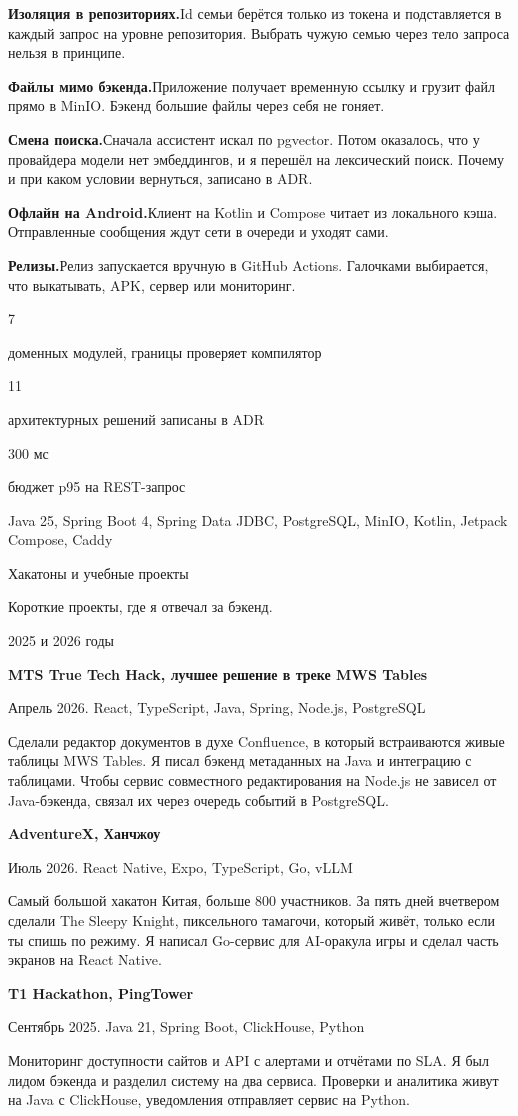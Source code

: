 \documentclass[10pt,a4paper]{article}
\newcommand{\casehead}[3]{%
  {\display\fontsize{30}{32}\selectfont #1\par}
  \vspace{2pt}
  {\large #2\par}
  \vspace{2pt}
  {\small\color{muted} #3\par}
  \vspace{8pt}
}
\newcommand{\blocklabel}[1]{\vspace{6pt}{\medium\small\color{accent} #1}\par\vspace{-2pt}}
\newcommand{\decision}[2]{\textbf{#1}\quad #2\par}
\newcommand{\result}[2]{%
  \begin{minipage}[t]{0.31\textwidth}
    {\display\fontsize{22}{24}\selectfont\color{accent} #1\par}
    \vspace{2pt}
    {\small\RaggedRight\color{muted} #2\par}
  \end{minipage}%
}
\newcommand{\results}[6]{%
  \vspace{8pt}
  \noindent\result{#1}{#2}\hfill\result{#3}{#4}\hfill\result{#5}{#6}\par
  \vspace{4pt}
}
\newcommand{\project}[3]{%
  \begin{minipage}[t]{\linewidth}
    {\large\textbf{#1}\par}
    {\small\color{muted} #2\par}
    \vspace{2pt}
    #3\par
  \end{minipage}\par\vspace{10pt}
}
\begin{document}
\blocklabel{Решения}
\decision{Изоляция в репозиториях.}{Id семьи берётся только из токена и подставляется в каждый запрос на
уровне репозитория. Выбрать чужую семью через тело запроса нельзя в принципе.}

\decision{Файлы мимо бэкенда.}{Приложение получает временную ссылку и грузит файл прямо в MinIO.
Бэкенд большие файлы через себя не гоняет.}

\decision{Смена поиска.}{Сначала ассистент искал по pgvector. Потом оказалось, что у провайдера модели нет
эмбеддингов, и я перешёл на лексический поиск. Почему и при каком условии вернуться, записано в ADR.}

\decision{Офлайн на Android.}{Клиент на Kotlin и Compose читает из локального кэша. Отправленные сообщения
ждут сети в очереди и уходят сами.}

\decision{Релизы.}{Релиз запускается вручную в GitHub Actions. Галочками выбирается, что выкатывать, APK,
сервер или мониторинг.}

\results
  {7}{доменных модулей, границы проверяет компилятор}
  {11}{архитектурных решений записаны в ADR}
  {300 мс}{бюджет p95 на REST-запрос}

{\small\color{muted} Java 25, Spring Boot 4, Spring Data JDBC, PostgreSQL, MinIO, Kotlin, Jetpack Compose, Caddy\par}

\newpage
\casehead{Хакатоны и учебные проекты}
  {Короткие проекты, где я отвечал за бэкенд.}
  {2025 и 2026 годы}

\project{MTS True Tech Hack, лучшее решение в треке MWS Tables}{Апрель 2026. React, TypeScript, Java, Spring, Node.js, PostgreSQL}
{Сделали редактор документов в духе Confluence, в который встраиваются живые таблицы MWS Tables. Я писал
бэкенд метаданных на Java и интеграцию с таблицами. Чтобы сервис совместного редактирования на Node.js не
зависел от Java-бэкенда, связал их через очередь событий в PostgreSQL.}

\project{AdventureX, Ханчжоу}{Июль 2026. React Native, Expo, TypeScript, Go, vLLM}
{Самый большой хакатон Китая, больше 800 участников. За пять дней вчетвером сделали The Sleepy Knight,
пиксельного тамагочи, который живёт, только если ты спишь по режиму. Я написал Go-сервис для AI-оракула
игры и сделал часть экранов на React Native.}

\project{T1 Hackathon, PingTower}{Сентябрь 2025. Java 21, Spring Boot, ClickHouse, Python}
{Мониторинг доступности сайтов и API с алертами и отчётами по SLA. Я был лидом бэкенда и разделил систему
на два сервиса. Проверки и аналитика живут на Java с ClickHouse, уведомления отправляет сервис на Python.}
\end{document}
